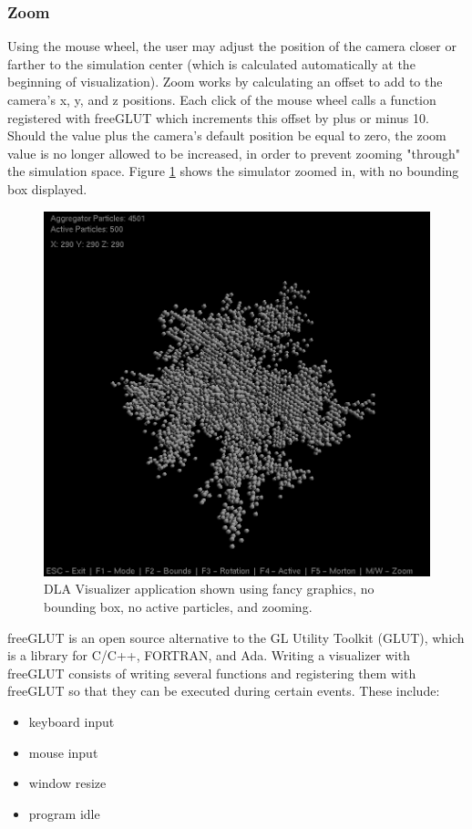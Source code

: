 \documentclass[fleqn,10pt]{UserGuideArx} %
\begin{document}
\subsubsection{Zoom}
Using the mouse wheel, the user may adjust the position of the camera closer or farther to the simulation center (which is calculated automatically at the beginning of visualization). Zoom works by calculating an offset to add to the camera's x, y, and z positions. Each click of the mouse wheel calls a function registered with freeGLUT which increments this offset by plus or minus 10. Should the value plus the camera's default position be equal to zero, the zoom value is no longer allowed to be increased, in order to prevent zooming "through" the simulation space. Figure \ref{fig:FancyNoBound} shows the simulator zoomed in, with no bounding box displayed.\\

\begin{figure}[!ht]\centering %
    \includegraphics[width=\linewidth]{images/FancyNoBound.png}
    \caption{DLA Visualizer application shown using fancy graphics, no bounding box, no active particles, and zooming.}
    \label{fig:FancyNoBound}
    \end{figure}

freeGLUT is an open source alternative to the GL Utility Toolkit (GLUT), which is a library for C/C++, FORTRAN, and Ada. Writing a visualizer with freeGLUT consists of writing several functions and registering them with freeGLUT so that they can be executed during certain events. These include:
\begin{itemize}
    \item keyboard input
    \item mouse input
    \item window resize
    \item program idle
\end{itemize}
~\\
\end{document}
